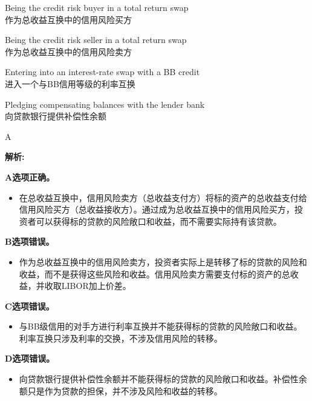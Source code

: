 \documentclass{article}
\newenvironment{explanation}
{\textbf{解析:}\par}
{\par}
\begin{document}
\begin{choices}
    \item Being the credit risk buyer in a total return swap\\
    作为总收益互换中的信用风险买方
    \item Being the credit risk seller in a total return swap\\
    作为总收益互换中的信用风险卖方
    \item Entering into an interest-rate swap with a BB credit\\
    进入一个与BB信用等级的利率互换
    \item Pledging compensating balances with the lender bank\\
    向贷款银行提供补偿性余额
\end{choices}

\begin{correctanswer}
    A
\end{correctanswer}

\begin{explanation}
    \textbf{A选项正确。}
    \begin{itemize}
    \item 在总收益互换中，信用风险卖方（总收益支付方）将标的资产的总收益支付给信用风险买方（总收益接收方）。通过成为总收益互换中的信用风险买方，投资者可以获得标的贷款的风险敞口和收益，而不需要实际持有该贷款。
    \end{itemize}

    \textbf{B选项错误。}
    \begin{itemize}
    \item 作为总收益互换中的信用风险卖方，投资者实际上是转移了标的贷款的风险和收益，而不是获得这些风险和收益。信用风险卖方需要支付标的资产的总收益，并收取LIBOR加上价差。
    \end{itemize}

    \textbf{C选项错误。}
    \begin{itemize}
    \item 与BB级信用的对手方进行利率互换并不能获得标的贷款的风险敞口和收益。利率互换只涉及利率的交换，不涉及信用风险的转移。
    \end{itemize}

    \textbf{D选项错误。}
    \begin{itemize}
    \item 向贷款银行提供补偿性余额并不能获得标的贷款的风险敞口和收益。补偿性余额只是作为贷款的担保，并不涉及风险和收益的转移。
    \end{itemize}
\end{explanation}
\end{document}
